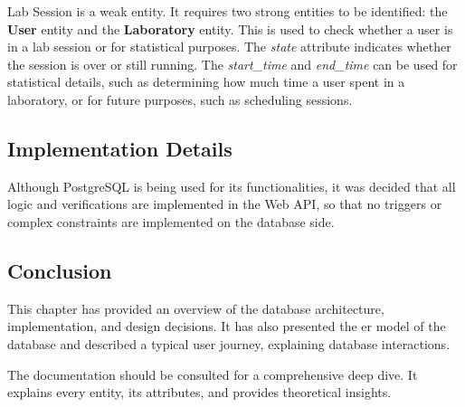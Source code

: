 Lab Session is a weak entity. It requires two strong entities to be identified: the \textbf{User} entity and the \textbf{Laboratory} entity. This is used to check whether a user is in a lab session or for statistical purposes. The \textit{state} attribute indicates whether the session is over or still running. The \textit{start\_time} and \textit{end\_time} can be used for statistical details, such as determining how much time a user spent in a laboratory, or for future purposes, such as scheduling sessions.

\subsection{Implementation Details}
Although PostgreSQL is being used for its functionalities, it was decided that all logic and verifications are implemented in the Web API, so that no triggers or complex constraints are implemented on the database side.

\subsection{Conclusion}
This chapter has provided an overview of the database architecture, implementation, and design decisions. It has also presented the \acs{er model} of the database and described a typical user journey, explaining database interactions.

The documentation should be consulted for a comprehensive deep dive. It explains every entity, its attributes, and provides theoretical insights.